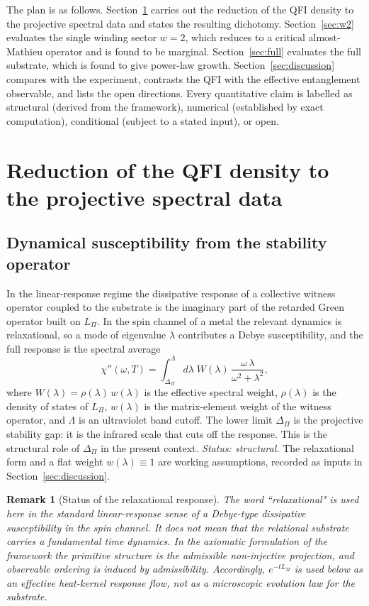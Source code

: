 \documentclass[11pt]{article}
\newtheorem{remark}{Remark}
\newcommand{\DPi}{\Delta_\Pi}
\newcommand{\Lap}{L_\Pi}
\begin{document}
The plan is as follows.
Section~\ref{sec:reduction} carries out the reduction of the QFI density to the projective spectral data and
states the resulting dichotomy.
Section~\ref{sec:w2} evaluates the single winding sector $w=2$, which reduces to a critical almost-Mathieu
operator and is found to be marginal.
Section~\ref{sec:full} evaluates the full substrate, which is found to give power-law growth.
Section~\ref{sec:discussion} compares with the experiment, contrasts the QFI with the effective entanglement
observable, and lists the open directions.
Every quantitative claim is labelled as structural (derived from the framework), numerical (established by exact
computation), conditional (subject to a stated input), or open.

\section{Reduction of the QFI density to the projective spectral data}
\label{sec:reduction}

\subsection{Dynamical susceptibility from the stability operator}

In the linear-response regime the dissipative response of a collective witness operator coupled to the substrate is
the imaginary part of the retarded Green operator built on $\Lap$.
In the spin channel of a metal the relevant dynamics is relaxational, so a mode of eigenvalue $\lambda$ contributes
a Debye susceptibility, and the full response is the spectral average
\begin{equation}
\chi''(\omega,T) = \int_{\DPi}^{\Lambda} d\lambda \; W(\lambda)\,\frac{\omega\,\lambda}{\omega^2+\lambda^2},
\label{eq:chi}
\end{equation}
where $W(\lambda)=\rho(\lambda)\,w(\lambda)$ is the effective spectral weight, $\rho(\lambda)$ is the density of
states of $\Lap$, $w(\lambda)$ is the matrix-element weight of the witness operator, and $\Lambda$ is an
ultraviolet band cutoff.
The lower limit $\DPi$ is the projective stability gap: it is the infrared scale that cuts off the response.
This is the structural role of $\DPi$ in the present context.
\emph{Status: structural.}
The relaxational form and a flat weight $w(\lambda)\equiv 1$ are working assumptions, recorded as inputs in
Section~\ref{sec:discussion}.

\begin{remark}[Status of the relaxational response]
The word ``relaxational" is used here in the standard linear-response sense of a Debye-type dissipative
susceptibility in the spin channel.
It does not mean that the relational substrate carries a fundamental time dynamics.
In the axiomatic formulation of the framework the primitive structure is the admissible non-injective projection,
and observable ordering is induced by admissibility.
Accordingly, $e^{-t\Lap}$ is used below as an effective heat-kernel response flow, not as a microscopic evolution
law for the substrate.
\end{remark}
\end{document}
